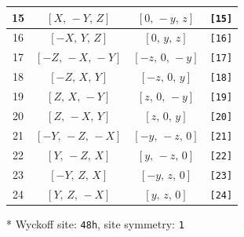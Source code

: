 \documentclass[fleqn,8pt]{jsarticle}
\begin{document}
\begin{longtable}{cccc}
15 & $\left[ X,\, - Y,\, Z \right]$ & $\left[ 0,\, - y,\, z \right]$ & {\tt [15]} \\ \hline
16 & $\left[ - X,\, Y,\, Z \right]$ & $\left[ 0,\, y,\, z \right]$ & {\tt [16]} \\ \hline
17 & $\left[ - Z,\, - X,\, - Y \right]$ & $\left[ - z,\, 0,\, - y \right]$ & {\tt [17]} \\ \hline
18 & $\left[ - Z,\, X,\, Y \right]$ & $\left[ - z,\, 0,\, y \right]$ & {\tt [18]} \\ \hline
19 & $\left[ Z,\, X,\, - Y \right]$ & $\left[ z,\, 0,\, - y \right]$ & {\tt [19]} \\ \hline
20 & $\left[ Z,\, - X,\, Y \right]$ & $\left[ z,\, 0,\, y \right]$ & {\tt [20]} \\ \hline
21 & $\left[ - Y,\, - Z,\, - X \right]$ & $\left[ - y,\, - z,\, 0 \right]$ & {\tt [21]} \\ \hline
22 & $\left[ Y,\, - Z,\, X \right]$ & $\left[ y,\, - z,\, 0 \right]$ & {\tt [22]} \\ \hline
23 & $\left[ - Y,\, Z,\, X \right]$ & $\left[ - y,\, z,\, 0 \right]$ & {\tt [23]} \\ \hline
24 & $\left[ Y,\, Z,\, - X \right]$ & $\left[ y,\, z,\, 0 \right]$ & {\tt [24]} \\
\end{longtable}
* Wyckoff site: {\tt 48h}, site symmetry: {\tt 1}
\renewcommand{\arraystretch}{1.2}
\end{document}
